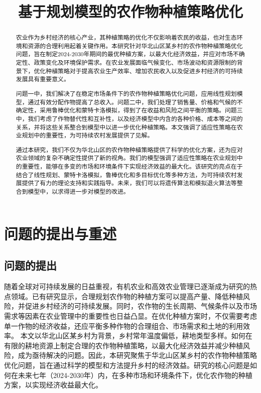 \documentclass{cumcmthesis}
\title{基于规划模型的农作物种植策略优化}
\begin{document}
\maketitle

\begin{abstract}
农业作为乡村经济的核心产业，其种植策略的优化不仅影响着农民的收益，也对生态环境和资源的合理利用起着关键作用。本研究针对华北山区某乡村的农作物种植策略优化问题，旨在制定2024-2030年期间的最优种植方案，以最大化经济效益，并应对市场不确定性、政策变化及环境保护需求。在农业发展面临气候变化、市场波动和资源限制的背景下，优化种植策略对于提高农业生产效率、增加农民收入以及促进乡村经济的可持续发展具有重要意义。

问题一中，我们解决了在稳定市场条件下的农作物种植策略优化问题，应用线性规划模型，通过有效分配作物提高了总收入。问题二中，我们处理了销售量、价格和气候的不确定性，采用鲁棒优化和蒙特卡洛模拟，得到了在收益和风险之间平衡的策略。问题三中，我们考虑了作物替代性和互补性，以及经济模型中内含的各种价格、成本等之间的关系，并将这些关系整合到模型中以进一步优化种植策略。本文强调了适应性策略在农业规划中的重要性，为可持续农村发展提供了见解。

通过本研究，我们不仅为华北山区的农作物种植策略提供了科学的优化方案，还为应对农业领域的复杂不确定性提供了新的视角。我们的模型强调了适应性策略在农业规划中的重要性，能够在多变的市场和环境条件下实现经济效益的最大化。该研究的亮点在于结合了线性规划、蒙特卡洛模拟，鲁棒优化和多目标优化等多种方法，为可持续农村发展提供了有力的理论支持和实践指导。未来，我们可以将遗传算法和模拟退火算法等整合到模型中，以求得进一步对模型的改进。


\end{abstract}

\section{问题的提出与重述}
\subsection{问题的提出}
随着全球对可持续发展的日益重视，有机农业和高效农业管理已逐渐成为研究的热点领域。已有研究显示，合理规划农作物的种植方案可以提高产量、降低种植风险，并促进乡村经济的可持续发展\cite{ref1}。同时，农作物的生长周期、气候条件以及市场需求等因素在农业管理中的重要性也日益凸显。在优化种植方案时，不仅需要考虑单一作物的经济收益，还应平衡多种作物的合理组合、市场需求和土地的利用效率。
本文以华北山区某乡村为背景，乡村常年温度偏低，耕地类型多样。如何在有限的耕地资源上制定合理的农作物种植策略，以最大化经济效益并减少种植风险，成为亟待解决的问题。因此，本研究聚焦于华北山区某乡村的农作物种植策略优化问题，旨在通过科学的模型和方法提升乡村的经济效益。研究的核心问题是如何在未来七年（2024-2030年）内，在多种市场和环境条件下，优化农作物的种植方案，以实现经济收益最大化。
\end{document}
